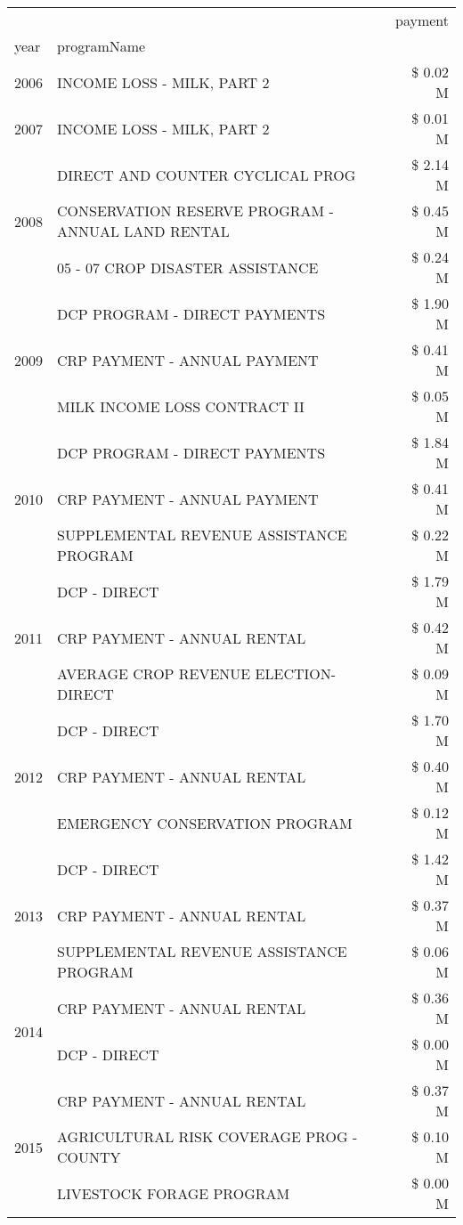 \begin{tabular}{llr}
\toprule
 &  & payment \\
year & programName &  \\
\midrule
2006 & INCOME LOSS - MILK, PART 2 & \$ 0.02 M \\
\cline{1-3}
2007 & INCOME LOSS - MILK, PART 2 & \$ 0.01 M \\
\cline{1-3}
\multirow[t]{3}{*}{2008} & DIRECT AND COUNTER CYCLICAL PROG & \$ 2.14 M \\
 & CONSERVATION RESERVE PROGRAM - ANNUAL LAND RENTAL & \$ 0.45 M \\
 & 05 - 07 CROP DISASTER ASSISTANCE & \$ 0.24 M \\
\cline{1-3}
\multirow[t]{3}{*}{2009} & DCP PROGRAM - DIRECT PAYMENTS & \$ 1.90 M \\
 & CRP PAYMENT - ANNUAL PAYMENT & \$ 0.41 M \\
 & MILK INCOME LOSS CONTRACT II & \$ 0.05 M \\
\cline{1-3}
\multirow[t]{3}{*}{2010} & DCP PROGRAM - DIRECT PAYMENTS & \$ 1.84 M \\
 & CRP PAYMENT - ANNUAL PAYMENT & \$ 0.41 M \\
 & SUPPLEMENTAL REVENUE ASSISTANCE PROGRAM & \$ 0.22 M \\
\cline{1-3}
\multirow[t]{3}{*}{2011} & DCP - DIRECT & \$ 1.79 M \\
 & CRP PAYMENT - ANNUAL RENTAL & \$ 0.42 M \\
 & AVERAGE CROP REVENUE ELECTION-DIRECT & \$ 0.09 M \\
\cline{1-3}
\multirow[t]{3}{*}{2012} & DCP - DIRECT & \$ 1.70 M \\
 & CRP PAYMENT - ANNUAL RENTAL & \$ 0.40 M \\
 & EMERGENCY CONSERVATION PROGRAM & \$ 0.12 M \\
\cline{1-3}
\multirow[t]{3}{*}{2013} & DCP - DIRECT & \$ 1.42 M \\
 & CRP PAYMENT - ANNUAL RENTAL & \$ 0.37 M \\
 & SUPPLEMENTAL REVENUE ASSISTANCE PROGRAM & \$ 0.06 M \\
\cline{1-3}
\multirow[t]{2}{*}{2014} & CRP PAYMENT - ANNUAL RENTAL & \$ 0.36 M \\
 & DCP - DIRECT & \$ 0.00 M \\
\cline{1-3}
\multirow[t]{3}{*}{2015} & CRP PAYMENT - ANNUAL RENTAL & \$ 0.37 M \\
 & AGRICULTURAL RISK COVERAGE PROG - COUNTY & \$ 0.10 M \\
 & LIVESTOCK FORAGE PROGRAM & \$ 0.00 M \\

\end{tabular}

